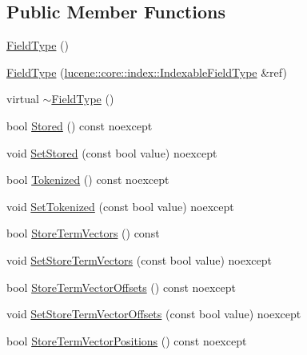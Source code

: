 \subsection*{Public Member Functions}
\begin{DoxyCompactItemize}
\item 
\mbox{\hyperlink{classlucene_1_1core_1_1document_1_1FieldType_a8e7a413c31bb8225b7fef2acc596ee30}{Field\+Type}} ()
\item 
\mbox{\hyperlink{classlucene_1_1core_1_1document_1_1FieldType_a6dc48b19b7db06668283b220b6dee364}{Field\+Type}} (\mbox{\hyperlink{classlucene_1_1core_1_1index_1_1IndexableFieldType}{lucene\+::core\+::index\+::\+Indexable\+Field\+Type}} \&ref)
\item 
virtual \mbox{\hyperlink{classlucene_1_1core_1_1document_1_1FieldType_a602c3c4d7c55e3d4e29c68876b822ceb}{$\sim$\+Field\+Type}} ()
\item 
bool \mbox{\hyperlink{classlucene_1_1core_1_1document_1_1FieldType_a7f3538d7e8046e64fda651af0c368292}{Stored}} () const noexcept
\item 
void \mbox{\hyperlink{classlucene_1_1core_1_1document_1_1FieldType_a90ff0100378b168a5adeff9515f911f7}{Set\+Stored}} (const bool value) noexcept
\item 
bool \mbox{\hyperlink{classlucene_1_1core_1_1document_1_1FieldType_ad46702a08ecdf7c0138bc950865f074c}{Tokenized}} () const noexcept
\item 
void \mbox{\hyperlink{classlucene_1_1core_1_1document_1_1FieldType_a47fba625f69a19d9cce15e382fef0614}{Set\+Tokenized}} (const bool value) noexcept
\item 
bool \mbox{\hyperlink{classlucene_1_1core_1_1document_1_1FieldType_a435252ecad335aa118a4af5349342d0b}{Store\+Term\+Vectors}} () const
\item 
void \mbox{\hyperlink{classlucene_1_1core_1_1document_1_1FieldType_ad6291f33c009a52c6f51ac86d23d65bc}{Set\+Store\+Term\+Vectors}} (const bool value) noexcept
\item 
bool \mbox{\hyperlink{classlucene_1_1core_1_1document_1_1FieldType_a4a1396db204e1f64194b6628662ba6d5}{Store\+Term\+Vector\+Offsets}} () const noexcept
\item 
void \mbox{\hyperlink{classlucene_1_1core_1_1document_1_1FieldType_ab4bed951e0425edea547a45c1c442aa9}{Set\+Store\+Term\+Vector\+Offsets}} (const bool value) noexcept
\item 
bool \mbox{\hyperlink{classlucene_1_1core_1_1document_1_1FieldType_a72efd28a7f75bff7751e34edd7688c99}{Store\+Term\+Vector\+Positions}} () const noexcept

\end{DoxyCompactItemize}
